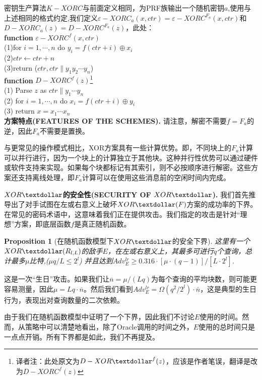 \documentclass[]{article}
\newtheorem{proposition}{Proposition}
\begin{document}
密钥生产算法$K-XORC$与前面定义相同，为PRF族输出一个随机密钥$a$,使用与上述相同的格式约定,我们定义$\varepsilon-XORC_a(x,ctr)=\varepsilon-XORC^{F_a}(x,ctr)$和$D-XORC_a(z)=D-XORC^{F_a}(z)$，此处：\\
\textbf{function} $\varepsilon-XORC^f(x,ctr)$\\
(1)for $i=1,\cdots,n$ do $y_i=f(ctr+i)\oplus x_i$ \\
(2)$ctr\leftarrow ctr+n$ \\
(3)return ($ctr,ctr\parallel y_1y_2\cdots y_n$)\\
\textbf{function} $D-XORC^f(z)$\footnote{译者注：此处原文为$D-XOR\textdollar^f(z)$，应该是作者笔误，翻译是改为$D-XORC^f(z)$}\\
(1) Parse $z$ as $ctr \parallel y_1\cdots y_n$\\
(2) for $i=1,\cdots,n$ do $x_i=f(ctr+i)\oplus y_i$\\
(3) return $x=x_1\cdots x_n$\\


\textbf{{\large 方案特点(FEATURES OF THE SCHEMES).}}   请注意，解密不需要$f=F_a$的逆，因此$F_a$不需要是置换。

与更常见的操作模式相比，XOR方案具有一些计算优势。即，不同块上的$F_a$计算可以并行进行，因为一个块上的计算独立于其他块。这种并行性优势可以通过硬件或软件支持来实现。如果每个块都标记有其索引，则不必按顺序进行解密。这些方案还支持离线处理，即$F_a$计算可以在使用这些消息前的空闲时间内完成。

\textbf{{\large $XOR\textdollar$的安全性(SECURITY OF $XOR\textdollar$).}}   我们首先推导出了对手试图在左或右意义上破坏$XOR\textdollar(F)$方案的成功率的下界。在常见的密码术语中，这意味着我们正在提供攻击。我们指定的攻击是针对“理想”方案，即底层函数$f$是真正随机函数。

\begin{proposition}[在随机函数模型下$XOR\textdollar$的安全下界]\label{XORSECBOUNDS}
	这里有一个$XOR\textdollar(R_{l,L})$的敌手$E$，在左或右意义上，其最多可进行$q$个查询，总计最多$\mu$比特,($\mu q /L \leq 2^l$) 并且达到$Adv_E^{lr}\geq 0.316\cdot [\mu\cdot (q-1)]/[L\cdot 2^l]$.
\end{proposition}

这是一次“生日”攻击。如果我们让$\overline{n}=\mu / (Lq)$为每个查询的平均块数，则可能更容易测量，因此$\mu =Lq\cdot \overline{n}$。然后我们看到$Adv^{lr}_E = \Omega(q^2/2^l)\cdot \overline{n}$，这是典型的生日行为，表现出对查询数量的二次依赖。

由于我们在随机函数模型中证明了一个下界，因此我们不讨论$E$使用的时间。然而，从策略中可以清楚地看出，除了Oracle调用的时间之外，$E$使用的总时间只是一点点开销。所有下界都是如此，我们不再提及。
\end{document}
